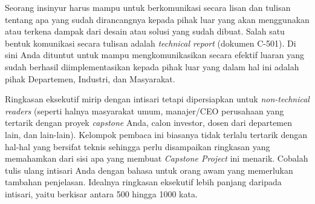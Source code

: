 
Seorang insinyur harus mampu untuk berkomunikasi secara lisan dan tulisan tentang apa yang sudah dirancangnya kepada pihak luar yang akan menggunakan atau terkena dampak dari desain atau solusi yang sudah dibuat. Salah satu bentuk komunikasi secara tulisan adalah \textit{technical report} (dokumen C-501). Di sini Anda dituntut untuk mampu mengkomunikasikan secara efektif luaran yang sudah berhasil diimplementasikan kepada pihak luar yang dalam hal ini adalah pihak Departemen, Industri, dan Masyarakat.

Ringkasan eksekutif mirip dengan intisari tetapi dipersiapkan untuk \textit{non-technical readers} (seperti halnya masyarakat umum, manajer/CEO perusahaan yang tertarik dengan proyek \textit{capstone} Anda, calon investor, dosen dari departemen lain, dan lain-lain). Kelompok pembaca ini biasanya tidak terlalu tertarik dengan hal-hal yang bersifat teknis sehingga perlu disampaikan ringkasan yang memahamkan dari sisi apa yang membuat \textit{Capstone Project} ini menarik. Cobalah tulis ulang intisari Anda dengan bahasa untuk orang awam yang memerlukan tambahan penjelasan. Idealnya ringkasan eksekutif lebih panjang daripada intisari, yaitu berkisar antara 500 hingga 1000 kata.
